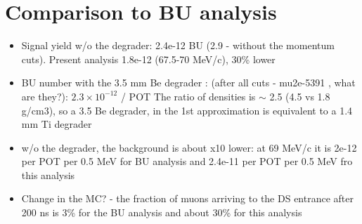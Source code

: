 \section{Comparison to BU analysis}

\begin{itemize}
\item 
  Signal yield w/o the degrader: 2.4e-12 BU (2.9 - without the momentum cuts).
  Present analysis 1.8e-12 (67.5-70 MeV/c), 30\% lower
\item
  BU number with the 3.5 mm Be degrader : (after all cuts - mu2e-5391 ,
  what are they?): $2.3 \times 10^{-12}$ / POT 
  The ratio of densities is $\sim$ 2.5 (4.5 vs 1.8 g/cm3),
  so a 3.5 Be degrader, in the 1st approximation is equivalent to a 1.4 mm Ti degrader
\item
  w/o the degrader, the background is about x10 lower:
  at 69 MeV/c it is 2e-12 per POT per 0.5 MeV for BU analysis
  and 2.4e-11 per POT per 0.5 MeV fro this analysis
\item
  Change in the MC? - the fraction of muons arriving to the DS entrance after 200 ns
  is 3\% for the BU analysis and about 30\% for this analysis
  
\end{itemize}


